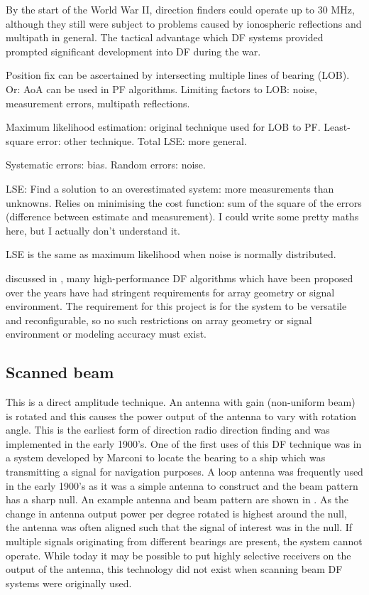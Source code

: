 By the start of  the World War II, direction finders could operate up to 30 MHz, although they still were subject to problems caused by ionospheric reflections and multipath in general. 
The tactical advantage which DF systems provided prompted significant development into DF during the war.

Position fix can be ascertained by intersecting multiple lines of bearing (LOB). Or: AoA can be used in PF algorithms. 
Limiting factors to LOB: noise, measurement errors, multipath reflections. 

Maximum likelihood estimation: original technique used for LOB to PF. 
Least-square error: other technique. Total LSE: more general. 

Systematic errors: bias. Random errors: noise. 

LSE: Find a solution to an overestimated system: more measurements than unknowns. Relies on minimising the cost function: sum of the square of the errors (difference between estimate and measurement). I could write some pretty maths here, but I actually don't understand it. 

LSE is the same as maximum likelihood when noise is normally distributed.

discussed in \cite{farrier1990direction}, many high-performance DF algorithms which have been proposed over the years have had stringent requirements for array geometry or signal environment. The requirement for this project is for the system to be versatile and reconfigurable, so no such restrictions on array geometry or signal environment or modeling accuracy must exist. 


\subsection{Scanned beam}
This is a direct amplitude technique. An antenna with gain (non-uniform beam) is rotated and this causes the power output of the antenna to vary with rotation angle. This is the earliest form of direction radio direction finding and was implemented in the early 1900's. 
One of the first uses of this DF technique was in a system developed by Marconi to locate the bearing to a ship which was transmitting a signal for navigation purposes\cite{jenkins1991smallaperture}. A loop antenna was frequently used in the early 1900's as it was a simple antenna to construct and the beam pattern has a sharp null. 
An example antenna and beam pattern are shown in . As the change in antenna output power per degree rotated is highest around the null, the antenna was often aligned such that the signal of interest was in the null. 
If multiple signals originating from different bearings are present, the system cannot operate. 
While today it may be possible to put highly selective receivers on the output of the antenna, this technology did not exist when scanning beam DF systems were originally used.

